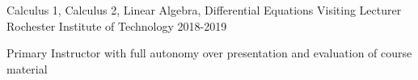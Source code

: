 \begin{cventries}
  \cventry
    {Calculus 1, Calculus 2, Linear Algebra, Differential Equations}
    {Visiting Lecturer}
    {Rochester Institute of Technology}
    {2018-2019}
    {
     \begin{cvitems}
      \item {Primary Instructor with full autonomy over presentation and evaluation of course material}
      \end{cvitems}
    }

\end{cventries}
